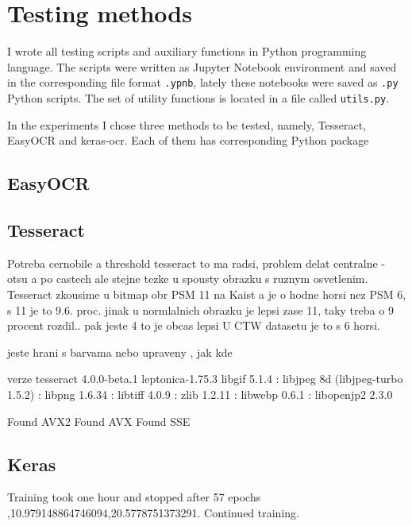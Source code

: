 \chapter{Testing methods}

I wrote all testing scripts and auxiliary functions in Python programming language. The scripts were written as Jupyter Notebook environment and saved in the corresponding file format \texttt{.ypnb}, lately these notebooks were saved as \texttt{.py} Python scripts. The set of utility functions is located in a file called \texttt{utils.py}.

In the experiments I chose three methods to be tested, namely, Tesseract, EasyOCR and keras-ocr. Each of them has corresponding Python package 

\section{EasyOCR}



\section{Tesseract}
Potreba cernobile a threshold tesseract to ma radsi, problem delat centralne - otsu a po castech ale stejne tezke u spousty obrazku s ruznym osvetlenim.
Tesseract zkousime u bitmap obr PSM 11 na Kaist a je o hodne horsi nez PSM 6, s 11 je to 9.6. proc. jinak u normlalnich obrazku je lepsi zase 11, taky treba o 9 procent rozdil.. pak jeste 4 to je obcas lepsi
U CTW datasetu je to s 6 horsi.

jeste hrani s barvama nebo upraveny , jak kde

verze
tesseract 4.0.0-beta.1
 leptonica-1.75.3
  libgif 5.1.4 : libjpeg 8d (libjpeg-turbo 1.5.2) : libpng 1.6.34 : libtiff 4.0.9 : zlib 1.2.11 : libwebp 0.6.1 : libopenjp2 2.3.0

 Found AVX2
 Found AVX
 Found SSE

\section{Keras}

Training took one hour and stopped after 57 epochs ,10.979148864746094,20.5778751373291. Continued training.